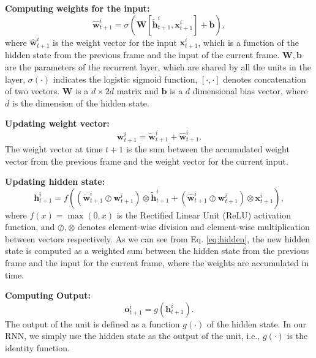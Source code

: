 \documentclass[conference]{IEEEtran}
\begin{document}
\textbf{Computing weights for the input: }
\begin{equation}
\widehat{\mathbf{w}}_{t+1}^{i} = \sigma (\mathbf{W} [ \widetilde{\mathbf{h}}_{t+1}^{i}, \mathbf{x}_{t+1}^{i} ] + \mathbf{b} ), \label{eq:weight}
\end{equation}
where $\widehat{\mathbf{w}}_{t+1}^{i}$ is the weight vector for the input $\mathbf{x}_{t+1}^{i}$, which is a function of the hidden state from the previous frame and the input of the current frame.  $\mathbf{W},\mathbf{b}$ are the parameters of the recurrent layer, which are shared by all the units in the layer, $\sigma(\cdot)$ indicates the logistic sigmoid function, $[\cdot, \cdot]$ denotes concatenation of two vectors. $\mathbf{W}$ is a $d \times 2d$ matrix and $\mathbf{b}$ is a $d$ dimensional bias vector, where $d$ is the dimension of the hidden state.

\textbf{Updating weight vector:}
\begin{equation} 
\mathbf{w}_{t+1}^{i} = \widetilde{\mathbf{w}}_{t+1}^{i} + \widehat{\mathbf{w}}_{t+1}^{i}.
\end{equation}
The weight vector at time $t+1$ is the sum between the accumulated weight vector from the previous frame and the weight vector for the current input.

\textbf{Updating hidden state:}
\begin{equation} \label{eq:hidden}
\mathbf{h}_{t+1}^{i} = f( (\widetilde{\mathbf{w}}_{t+1}^{i} \oslash \mathbf{w}_{t+1}^{i}) \otimes \widetilde{\mathbf{h}}_{t+1}^{i}  +  (\widehat{\mathbf{w}}_{t+1}^{i} \oslash \mathbf{w}_{t+1}^{i}) \otimes \mathbf{x}_{t+1}^{i} ),
\end{equation}
where $f(x) = \max(0, x)$ is the Rectified Linear Unit (ReLU) activation function, and $\oslash, \otimes$ denotes element-wise division and element-wise multiplication between vectors respectively. As we can see from Eq. \eqref{eq:hidden}, the new hidden state is computed as a weighted sum between the hidden state from the previous frame and the input for the current frame, where the weights are accumulated in time. 

\textbf{Computing Output:}
\begin{equation} 
\mathbf{o}_{t+1}^{i} = g(\mathbf{h}_{t+1}^{i}).
\end{equation}
The output of the unit is defined as a function $g(\cdot)$ of the hidden state. In our RNN, we simply use the hidden state as the output of the unit, i.e., $g(\cdot)$ is the identity function.
\end{document}
